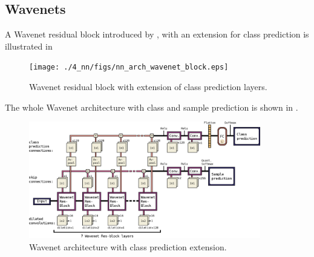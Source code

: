 %
%


\subsection{Wavenets}\label{sec:nn_arch_wavenet}

A Wavenet residual block introduced by \cite{Oord2016}, with an extension for class prediction is illustrated in  
\begin{figure}[!ht]
  \centering
    \texttt{[image: ./4\_nn/figs/nn\_arch\_wavenet\_block.eps]}
  \caption{Wavenet residual block \cite{Oord2016} with extension of class prediction layers.}
  \label{fig:nn_arch_wavenet_block}
\end{figure}
\FloatBarrier
\noindent
The whole Wavenet architecture with class and sample prediction is shown in .
\begin{figure}[!ht]
  \centering
    \includegraphics[width=0.9\textwidth]{./4_nn/figs/nn_arch_wavenet_all.eps}
  \caption{Wavenet architecture with class prediction extension.}
  \label{fig:nn_arch_wavenet_all}
\end{figure}
\FloatBarrier
\noindent

